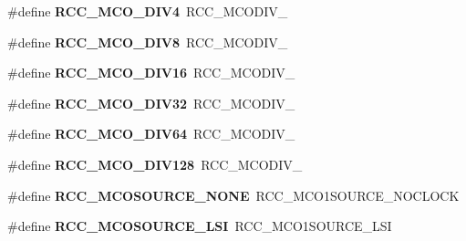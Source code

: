 \begin{DoxyCompactItemize}
\item 
\mbox{\label{group___h_a_l___r_c_c___aliased_gadde6fd8dbc7f1e750aea3903bedffa7d}} 
\#define {\bfseries R\+C\+C\+\_\+\+M\+C\+O\+\_\+\+D\+I\+V4}~R\+C\+C\+\_\+\+M\+C\+O\+D\+I\+V\+\_
\item 
\mbox{\label{group___h_a_l___r_c_c___aliased_ga00b1ed5dae888fa26fcaf66429c617da}} 
\#define {\bfseries R\+C\+C\+\_\+\+M\+C\+O\+\_\+\+D\+I\+V8}~R\+C\+C\+\_\+\+M\+C\+O\+D\+I\+V\+\_
\item 
\mbox{\label{group___h_a_l___r_c_c___aliased_ga4e8e30ec40f362037055d5977a9e2ea0}} 
\#define {\bfseries R\+C\+C\+\_\+\+M\+C\+O\+\_\+\+D\+I\+V16}~R\+C\+C\+\_\+\+M\+C\+O\+D\+I\+V\+\_
\item 
\mbox{\label{group___h_a_l___r_c_c___aliased_ga26c54546e41690456e3a57cd46a3b16a}} 
\#define {\bfseries R\+C\+C\+\_\+\+M\+C\+O\+\_\+\+D\+I\+V32}~R\+C\+C\+\_\+\+M\+C\+O\+D\+I\+V\+\_
\item 
\mbox{\label{group___h_a_l___r_c_c___aliased_ga3e2f0bbc95937a013cdb3cc6bec61fe8}} 
\#define {\bfseries R\+C\+C\+\_\+\+M\+C\+O\+\_\+\+D\+I\+V64}~R\+C\+C\+\_\+\+M\+C\+O\+D\+I\+V\+\_
\item 
\mbox{\label{group___h_a_l___r_c_c___aliased_ga13db6fb3b4264a8fff9f671faf393f1b}} 
\#define {\bfseries R\+C\+C\+\_\+\+M\+C\+O\+\_\+\+D\+I\+V128}~R\+C\+C\+\_\+\+M\+C\+O\+D\+I\+V\+\_
\item 
\mbox{\label{group___h_a_l___r_c_c___aliased_ga55362c6bb39a405d997b64cf8db9709e}} 
\#define {\bfseries R\+C\+C\+\_\+\+M\+C\+O\+S\+O\+U\+R\+C\+E\+\_\+\+N\+O\+NE}~R\+C\+C\+\_\+\+M\+C\+O1\+S\+O\+U\+R\+C\+E\+\_\+\+N\+O\+C\+L\+O\+CK
\item 
\mbox{\label{group___h_a_l___r_c_c___aliased_ga71ac33c61f4246489cc1c34bebe9b45d}} 
\#define {\bfseries R\+C\+C\+\_\+\+M\+C\+O\+S\+O\+U\+R\+C\+E\+\_\+\+L\+SI}~R\+C\+C\+\_\+\+M\+C\+O1\+S\+O\+U\+R\+C\+E\+\_\+\+L\+SI
\item 

\end{DoxyCompactItemize}
